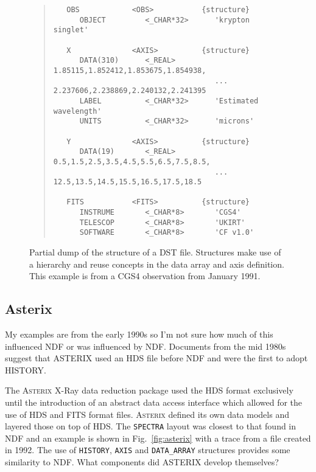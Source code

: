 \documentclass[final,authoryear,5p,times,twocolumn]{elsarticle}
\begin{document}
{\begin{figure*}
\begin{minipage}{\textwidth}
\begin{quote}
\begin{verbatim}
   OBS            <OBS>           {structure}
      OBJECT         <_CHAR*32>      'krypton singlet'

   X              <AXIS>          {structure}
      DATA(310)      <_REAL>         1.85115,1.852412,1.853675,1.854938,
                                     ... 2.237606,2.238869,2.240132,2.241395
      LABEL          <_CHAR*32>      'Estimated wavelength'
      UNITS          <_CHAR*32>      'microns'

   Y              <AXIS>          {structure}
      DATA(19)       <_REAL>         0.5,1.5,2.5,3.5,4.5,5.5,6.5,7.5,8.5,
                                     ... 12.5,13.5,14.5,15.5,16.5,17.5,18.5

   FITS           <FITS>          {structure}
      INSTRUME       <_CHAR*8>       'CGS4'
      TELESCOP       <_CHAR*8>       'UKIRT'
      SOFTWARE       <_CHAR*8>       'CF v1.0'
\end{verbatim}
\end{quote}
\caption{Partial dump of the structure of a DST file. Structures make
  use of a hierarchy and reuse concepts in the data array and axis
  definition. This example is from a CGS4 observation from January
  1991.}
\label{fig:dst}
\end{minipage}
\end{figure*}

\subsection{Asterix}

{\color{red} My examples are from the early 1990s so I'm not sure how
  much of this influenced NDF or was influenced by NDF. Documents from
  the mid 1980s suggest that ASTERIX used an HDS file before NDF and
  were the first to adopt HISTORY.}

The \textsc{Asterix} X-Ray data reduction package \citep{SUN98,1992STARB...9....3S} used the HDS
format exclusively until the introduction of an abstract data access
interface \citep{1995ASPC...77..199A} which allowed for the use of HDS
and FITS format files. \textsc{Asterix} defined its
own data models and layered those on top of HDS. The \texttt{SPECTRA}
layout was closest to that found in NDF and an example is shown in
Fig.\ \ref{fig:asterix} with a trace from a file created in 1992. The
use of \texttt{HISTORY}, \texttt{AXIS} and \texttt{DATA\_ARRAY}
structures provides some similarity to NDF. {\color{red} What
  components did ASTERIX develop themselves?}

}
\end{document}
